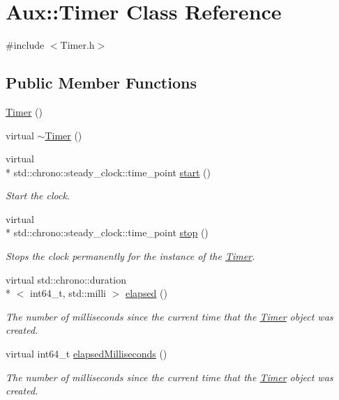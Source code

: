 \hypertarget{class_aux_1_1_timer}{\section{Aux\-:\-:Timer Class Reference}
\label{class_aux_1_1_timer}
}


{\ttfamily \#include $<$Timer.\-h$>$}

\subsection*{Public Member Functions}
\begin{DoxyCompactItemize}
\item 
\hyperlink{class_aux_1_1_timer_a20a52aee280d958a8a2a903ffdc0847e}{Timer} ()
\item 
virtual \hyperlink{class_aux_1_1_timer_ae5467925452fc10618acf8f5c27b46e6}{$\sim$\-Timer} ()
\item 
virtual \\*
std\-::chrono\-::steady\-\_\-clock\-::time\-\_\-point \hyperlink{class_aux_1_1_timer_a3c58e715148a05a6294743619d111bab}{start} ()
\begin{DoxyCompactList}\small\item\em Start the clock. \end{DoxyCompactList}\item 
virtual \\*
std\-::chrono\-::steady\-\_\-clock\-::time\-\_\-point \hyperlink{class_aux_1_1_timer_a14d926626eef461e836f87f7bc3d03b7}{stop} ()
\begin{DoxyCompactList}\small\item\em Stops the clock permanently for the instance of the \hyperlink{class_aux_1_1_timer}{Timer}. \end{DoxyCompactList}\item 
virtual std\-::chrono\-::duration\\*
$<$ int64\-\_\-t, std\-::milli $>$ \hyperlink{class_aux_1_1_timer_a16fdb76113530c5d4d8787e27d1e0aca}{elapsed} ()
\begin{DoxyCompactList}\small\item\em The number of milliseconds since the current time that the \hyperlink{class_aux_1_1_timer}{Timer} object was created. \end{DoxyCompactList}\item 
virtual int64\-\_\-t \hyperlink{class_aux_1_1_timer_accb4bddc6c528f7bceebe4fb43d10395}{elapsed\-Milliseconds} ()
\begin{DoxyCompactList}\small\item\em The number of milliseconds since the current time that the \hyperlink{class_aux_1_1_timer}{Timer} object was created. \end{DoxyCompactList}\item 

\end{DoxyCompactItemize}
